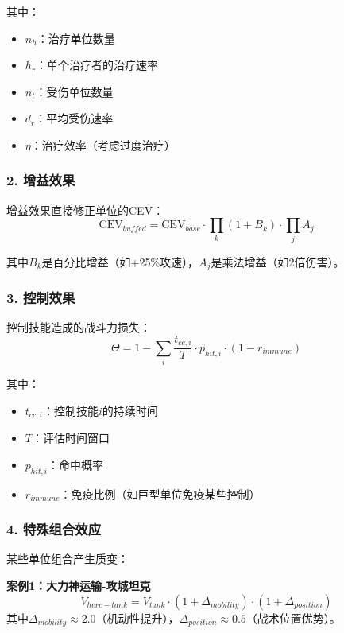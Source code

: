\documentclass[a4paper,12pt]{article}
\begin{document}
其中：
\begin{itemize}
\item $n_h$：治疗单位数量
\item $h_r$：单个治疗者的治疗速率
\item $n_t$：受伤单位数量
\item $d_r$：平均受伤速率
\item $\eta$：治疗效率（考虑过度治疗）
\end{itemize}

\subsubsection{2. 增益效果}
增益效果直接修正单位的CEV：
\begin{equation}
\text{CEV}_{buffed} = \text{CEV}_{base} \cdot \prod_k (1 + B_k) \cdot \prod_j A_j
\end{equation}

其中$B_k$是百分比增益（如+25\%攻速），$A_j$是乘法增益（如2倍伤害）。

\subsubsection{3. 控制效果}
控制技能造成的战斗力损失：
\begin{equation}
\Theta = 1 - \sum_i \frac{t_{cc,i}}{T} \cdot p_{hit,i} \cdot (1 - r_{immune})
\end{equation}

其中：
\begin{itemize}
\item $t_{cc,i}$：控制技能$i$的持续时间
\item $T$：评估时间窗口
\item $p_{hit,i}$：命中概率
\item $r_{immune}$：免疫比例（如巨型单位免疫某些控制）
\end{itemize}

\subsubsection{4. 特殊组合效应}
某些单位组合产生质变：

\textbf{案例1：大力神运输-攻城坦克}
\begin{equation}
V_{herc-tank} = V_{tank} \cdot (1 + \Delta_{mobility}) \cdot (1 + \Delta_{position})
\end{equation}
其中$\Delta_{mobility} \approx 2.0$（机动性提升），$\Delta_{position} \approx 0.5$（战术位置优势）。
\end{document}
